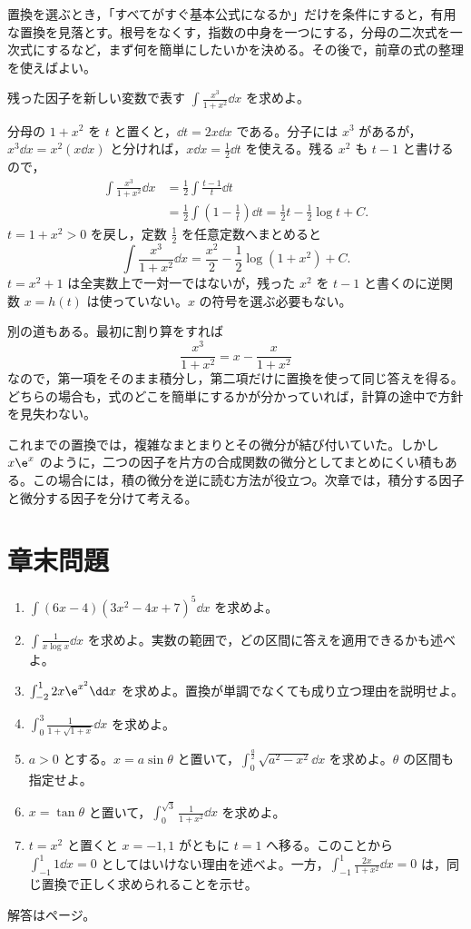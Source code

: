 置換を選ぶとき，「すべてがすぐ基本公式になるか」だけを条件にすると，有用な置換を見落とす。根号をなくす，指数の中身を一つにする，分母の二次式を一次式にするなど，まず何を簡単にしたいかを決める。その後で，前章の式の整理を使えばよい。

\begin{example}{残った因子を新しい変数で表す}
$\int\frac{x^3}{1+x^2}\dd x$ を求めよ。
\end{example}

分母の $1+x^2$ を $t$ と置くと，$\dd t=2x\dd x$ である。分子には $x^3$ があるが，$x^3\dd x=x^2(x\dd x)$ と分ければ，$x\dd x=\frac12\dd t$ を使える。残る $x^2$ も $t-1$ と書けるので，
\[
\begin{aligned}
 \int\frac{x^3}{1+x^2}\dd x
 &=\frac12\int\frac{t-1}{t}\dd t\\
 &=\frac12\int\left(1-\frac1t\right)\dd t
 =\frac12t-\frac12\log t+C.
\end{aligned}
\]
$t=1+x^2>0$ を戻し，定数 $\frac12$ を任意定数へまとめると
\[
 \int\frac{x^3}{1+x^2}\dd x
 =\frac{x^2}{2}-\frac12\log(1+x^2)+C.
\]
$t=x^2+1$ は全実数上で一対一ではないが，残った $x^2$ を $t-1$ と書くのに逆関数 $x=h(t)$ は使っていない。$x$ の符号を選ぶ必要もない。

別の道もある。最初に割り算をすれば
\[
 \frac{x^3}{1+x^2}=x-\frac{x}{1+x^2}
\]
なので，第一項をそのまま積分し，第二項だけに置換を使って同じ答えを得る。どちらの場合も，式のどこを簡単にするかが分かっていれば，計算の途中で方針を見失わない。

これまでの置換では，複雑なまとまりとその微分が結び付いていた。しかし $x\e^x$ のように，二つの因子を片方の合成関数の微分としてまとめにくい積もある。この場合には，積の微分を逆に読む方法が役立つ。次章では，積分する因子と微分する因子を分けて考える。

\section*{章末問題}
\begin{enumerate}[label=\textbf{\thechapter.\arabic*},leftmargin=*]
 \item\label{問:置換べき} $\int(6x-4)(3x^2-4x+7)^5\dd x$ を求めよ。
 \item\label{問:置換二重対数} $\int\frac1{x\log x}\dd x$ を求めよ。実数の範囲で，どの区間に答えを適用できるかも述べよ。
 \item\label{問:置換非単調} $\int_{-2}^1 2x\e^{x^2}\dd x$ を求めよ。置換が単調でなくても成り立つ理由を説明せよ。
 \item\label{問:置換根号分母} $\int_0^3\frac1{1+\sqrt{1+x}}\dd x$ を求めよ。
 \item\label{問:置換円弧} $a>0$ とする。$x=a\sin\theta$ と置いて，$\int_0^{\frac a2}\sqrt{a^2-x^2}\dd x$ を求めよ。$\theta$ の区間も指定せよ。
 \item\label{問:置換正接} $x=\tan\theta$ と置いて，$\int_0^{\sqrt3}\frac1{1+x^2}\dd x$ を求めよ。
 \item\label{問:置換枝の違い} $t=x^2$ と置くと $x=-1,1$ がともに $t=1$ へ移る。このことから $\int_{-1}^1 1\dd x=0$ としてはいけない理由を述べよ。一方，$\int_{-1}^1\frac{2x}{1+x^2}\dd x=0$ は，同じ置換で正しく求められることを示せ。
\end{enumerate}

\smallskip\noindent 解答は\pageref{解答:第5章}ページ。
